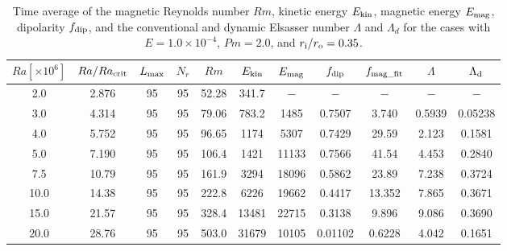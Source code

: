\begin{table}
{\color{red}
\caption{Time average of the magnetic Reynolds number $Rm$, kinetic energy $E_{\rm kin}$, magnetic energy $E_{\rm mag}$, dipolarity $f_{\rm dip}$, and  the conventional and dynamic Elsasser number $\Lambda$ and $\Lambda_{d}$ for the cases with $E = 1.0 \times 10^{-4}$, $Pm = 2.0$, and $r_{\rm i}/r_{\rm o} = 0.35$.}
}
{\color{red}
  \begin{tabular}{ccccccccccc}
    \hline
     $Ra[\times 10^6]$  &  $Ra/Ra_{\rm crit}$& 
     $L_{\rm max}$ & $N_{r}$ & $Rm$ 
     & $E_{\rm kin}$  &  $E_{\rm mag}$ & $f_{\rm dip}$ & $f_{\rm mag\_fit}$ & $\Lambda$ & $\Lambda_{\rm d}$\\
    \hline
      2.0 & 2.876 & 95 & 95 & 52.28 & 341.7 & $-$ & $-$ & $-$ & $-$ & $-$ \\
      3.0 & 4.314 & 95 & 95 & 79.06 & 783.2 & 1485 & 0.7507 & 3.740 & 0.5939 & 0.05238 \\
      4.0 & 5.752 & 95 & 95 & 96.65 & 1174 & 5307 & 0.7429 & 29.59 & 2.123 & 0.1581 \\
      5.0 & 7.190 & 95 & 95 & 106.4 & 1421 & 11133 & 0.7566 & 41.54 & 4.453 & 0.2840 \\
      7.5 & 10.79 & 95 & 95 & 161.9 & 3294 & 18096 & 0.5862 & 23.89 & 7.238 & 0.3724 \\
      10.0 & 14.38 & 95 & 95 & 222.8 & 6226 & 19662 & 0.4417 & 13.352 & 7.865 & 0.3671 \\
      15.0 & 21.57 & 95 & 95 & 328.4 & 13481 & 22715 & 0.3138 & 9.896 & 9.086 & 0.3690  \\
      20.0 & 28.76 & 95 & 95 & 503.0 & 31679 & 10105 & 0.01102 & 0.6228 & 4.042 & 0.1651 \\
    \hline
  \end{tabular}
 }
\label{table:SummaryEk4_35}
\end{table}
%
%
%
%

